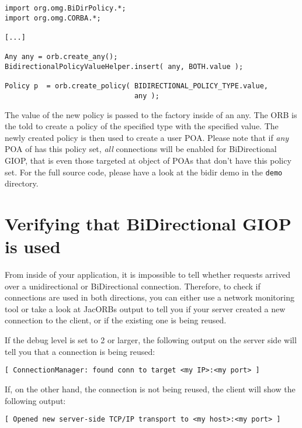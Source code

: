 \begin{verbatim}
import org.omg.BiDirPolicy.*;
import org.omg.CORBA.*;

[...]

Any any = orb.create_any();
BidirectionalPolicyValueHelper.insert( any, BOTH.value );

Policy p  = orb.create_policy( BIDIRECTIONAL_POLICY_TYPE.value,
                               any );
\end{verbatim}

The value of the new policy is passed to the factory inside of an any. The ORB
is the told to create a policy of the specified type with the specified
value. The newly created policy is then used to create a user POA. Please note
that if {\em any} POA of has this policy set, {\em all} connections will be
enabled for BiDirectional GIOP, that is even those targeted at object of POAs
that don't have this policy set. For the full source code, please have a look
at the bidir demo in the {\tt demo} directory.


\section{Verifying that BiDirectional GIOP is used}
From inside of your application, it is impossible to tell whether requests
arrived over a unidirectional or BiDirectional connection. Therefore, to check
if connections are used in both directions, you can either use a network
monitoring tool or take a look at JacORBs output to tell you if your server
created a new connection to the client, or if the existing one is being
reused.

If the debug level is set to 2 or larger, the following output on the server
side will tell you that a connection is being reused:

\begin{verbatim}
[ ConnectionManager: found conn to target <my IP>:<my port> ]
\end{verbatim}

If, on the other hand, the connection is not being reused, the client will
show the following output:
\begin{verbatim}
[ Opened new server-side TCP/IP transport to <my host>:<my port> ]
\end{verbatim}


